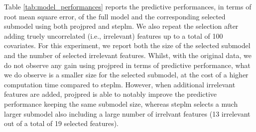 \documentclass[american,]{article}
\theoremstyle{definition}
\begin{document}

Table \ref{tab:model_performances} reports the predictive performances, in terms of root mean square error, of the full model and the corresponding selected submodel using both projpred and steplm. We also repeat the selection after adding truely uncorrelated (i.e., irrelevant) features up to a total of 100 covariates. For this experiment, we report both the size of the selected submodel and the number of selected irrelevant features. Whilst, with the original data, we do not observe any gain using projpred in terms of predictive performance, what we do observe is a smaller size for the selected submodel, at the cost of a higher computation time compared to steplm. However, when additional irrelevant features are added, projpred is able to notably improve the predictive performance keeping the same submodel size, whereas steplm selects a much larger submodel also including a large number of irrelvant features (13 irrelevant out of a total of 19 selected features).
\end{document}
